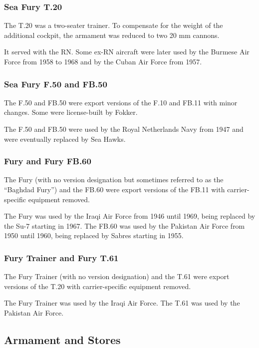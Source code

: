 \subsubsection{Sea Fury T.20}

The T.20 was a two-seater trainer. To compensate for the weight of the additional cockpit, the armament was reduced to two 20 mm cannons.

It served with the RN. Some ex-RN aircraft were later used by the Burmese Air Force from 1958 to 1968 and by the Cuban Air Force from 1957.

\subsubsection{Sea Fury F.50 and FB.50}

The F.50 and FB.50 were export versions of the F.10 and FB.11 with minor changes. Some were license-built by Fokker.

The F.50 and FB.50 were used by the Royal Netherlands Navy from 1947 and were eventually replaced by Sea Hawks.

\subsubsection{Fury and Fury FB.60}

The Fury (with no version designation but sometimes referred to as the “Baghdad Fury”) and the FB.60 were export versions of the FB.11 with carrier-specific equipment removed.

The Fury was used by the Iraqi Air Force from 1946 until 1969, being replaced by the Su-7 starting in 1967. The FB.60 was used by the Pakistan Air Force from 1950 until 1960, being replaced by Sabres starting in 1955.

\subsubsection{Fury Trainer and Fury T.61}

The Fury Trainer (with no version designation) and the T.61 were export versions of the T.20 with carrier-specific equipment removed.

The Fury Trainer was used by the Iraqi Air Force. The T.61 was used by the Pakistan Air Force.

\subsection{Armament and Stores}

